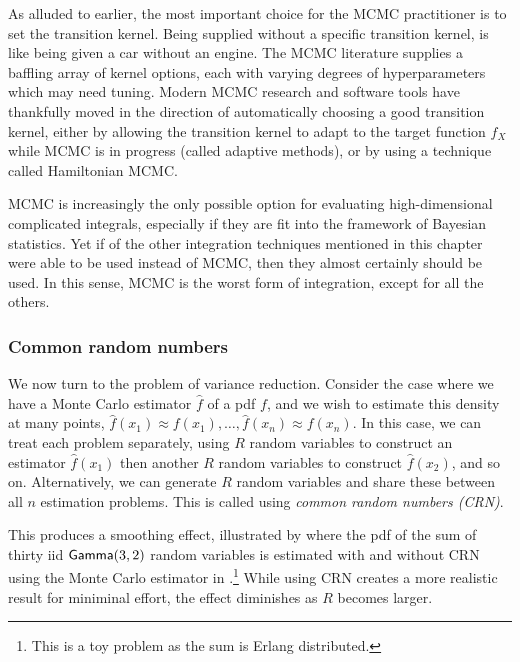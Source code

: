 As alluded to earlier, the most important choice for the MCMC practitioner is to set the transition kernel. Being supplied  without a specific transition kernel, is like being given a car without an engine. The MCMC literature supplies a baffling array of kernel options, each with varying degrees of hyperparameters which may need tuning. Modern MCMC research and software tools have thankfully moved in the direction of automatically choosing a good transition kernel, either by allowing the transition kernel to adapt to the target function $f_X$ while MCMC is in progress (called adaptive methods), or by using a technique called Hamiltonian MCMC.

MCMC is increasingly the only possible option for evaluating high-dimensional complicated integrals, especially if they are fit into the framework of Bayesian statistics. Yet if of the other integration techniques mentioned in this chapter were able to be used instead of MCMC, then they almost certainly should be used. In this sense, MCMC is the worst form of integration, except for all the others.


\subsubsection{Common random numbers}

We now turn to the problem of variance reduction. Consider the case where we have a Monte Carlo estimator $\hat{f}$ of a pdf $f$, and we wish to estimate this density at many points, $\hat{f}(x_1) \approx f(x_1), \dots, \hat{f}(x_n) \approx f(x_n)$. In this case, we can treat each problem separately, using $R$ random variables to construct an estimator $\hat{f}(x_1)$ then another $R$ random variables to construct $\hat{f}(x_2)$, and so on. Alternatively, we can generate $R$ random variables and share these between all $n$ estimation problems. This is called using \emph{common random numbers (CRN)}.

This produces a smoothing effect, illustrated by  where the pdf of the sum of thirty iid $\mathsf{Gamma}(3,2)$ random variables is estimated with and without CRN using the Monte Carlo estimator in \cite{Pushout}.\footnote{This is a toy problem as the sum is Erlang distributed.} While using CRN creates a more realistic result for miniminal effort, the effect diminishes as $R$ becomes larger.

